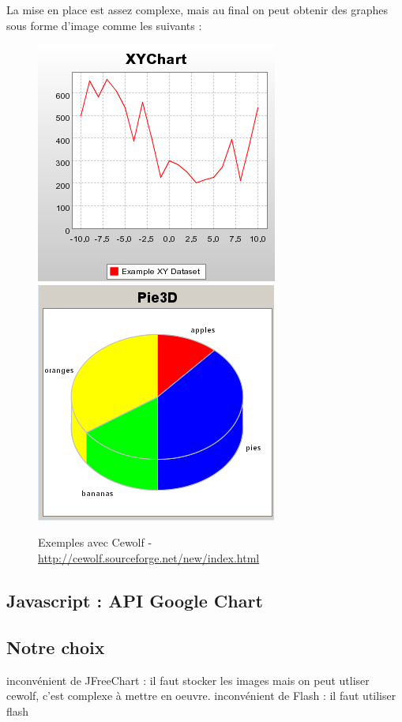 La mise en place est assez complexe, mais au final on peut obtenir des graphes sous forme d'image comme les suivants :
\begin{figure}[H]
  \center
  \includegraphics[scale=0.5]{../graph/cewolfEx1.png}
  \includegraphics[scale=0.5]{../graph/cewolfEx2.png} 
  \caption{Exemples avec Cewolf - \url{http://cewolf.sourceforge.net/new/index.html}}
\end{figure}

\subsection{Javascript : API Google Chart}

\subsection{Notre choix}

inconvénient de JFreeChart : il faut stocker les images mais on peut utliser cewolf, c'est complexe à mettre en oeuvre.
inconvénient de Flash : il faut utiliser flash
